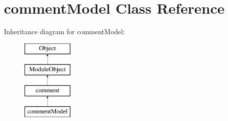 \hypertarget{classcommentModel}{\section{comment\-Model Class Reference}
\label{classcommentModel}
}
Inheritance diagram for comment\-Model\-:\begin{figure}[H]
\begin{center}
\leavevmode
\includegraphics[height=4.000000cm]{classcommentModel}
\end{center}
\end{figure}
